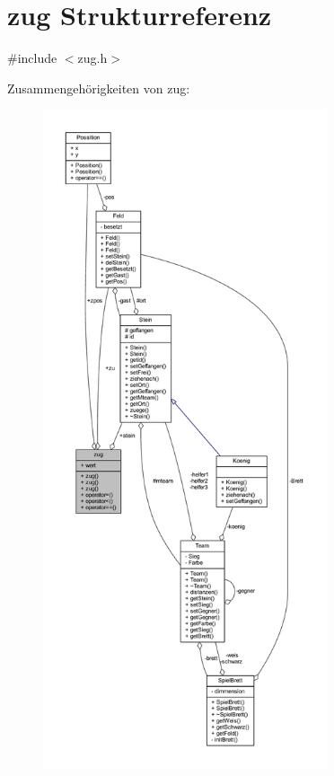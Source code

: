 \hypertarget{structzug}{}\section{zug Strukturreferenz}
\label{structzug}


{\ttfamily \#include $<$zug.\+h$>$}



Zusammengehörigkeiten von zug\+:\nopagebreak
\begin{figure}[H]
\begin{center}
\leavevmode
\includegraphics[height=550pt]{structzug__coll__graph}
\end{center}
\end{figure}
